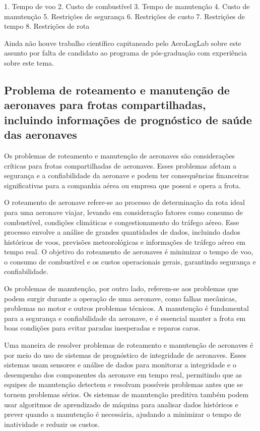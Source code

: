 \documentclass{article}
\begin{document}
1. Tempo de voo
2. Custo de combustível
3. Tempo de manutenção
4. Custo de manutenção
5. Restrições de segurança
6. Restrições de custo
7. Restrições de tempo
8. Restrições de rota

Ainda não houve trabalho científico capitaneado pelo AeroLogLab sobre este assunto por falta de candidato ao programa de pós-graduação com experiência sobre este tema.

\subsection{Problema de roteamento e manutenção de aeronaves para frotas compartilhadas, incluindo informações de prognóstico de saúde das aeronaves}

Os problemas de roteamento e manutenção de aeronaves são considerações críticas para frotas compartilhadas de aeronaves. Esses problemas afetam a segurança e a confiabilidade da aeronave e podem ter consequências financeiras significativas para a companhia aérea ou empresa que possui e opera a frota.

O roteamento de aeronave refere-se ao processo de determinação da rota ideal para uma aeronave viajar, levando em consideração fatores como consumo de combustível, condições climáticas e congestionamento do tráfego aéreo. Esse processo envolve a análise de grandes quantidades de dados, incluindo dados históricos de voos, previsões meteorológicas e informações de tráfego aéreo em tempo real. O objetivo do roteamento de aeronaves é minimizar o tempo de voo, o consumo de combustível e os custos operacionais gerais, garantindo segurança e confiabilidade.

Os problemas de manutenção, por outro lado, referem-se aos problemas que podem surgir durante a operação de uma aeronave, como falhas mecânicas, problemas no motor e outros problemas técnicos. A manutenção é fundamental para a segurança e confiabilidade da aeronave, e é essencial manter a frota em boas condições para evitar paradas inesperadas e reparos caros.

Uma maneira de resolver problemas de roteamento e manutenção de aeronaves é por meio do uso de sistemas de prognóstico de integridade de aeronaves. Esses sistemas usam sensores e análise de dados para monitorar a integridade e o desempenho dos componentes da aeronave em tempo real, permitindo que as equipes de manutenção detectem e resolvam possíveis problemas antes que se tornem problemas sérios. Os sistemas de manutenção preditiva também podem usar algoritmos de aprendizado de máquina para analisar dados históricos e prever quando a manutenção é necessária, ajudando a minimizar o tempo de inatividade e reduzir os custos.
\end{document}
